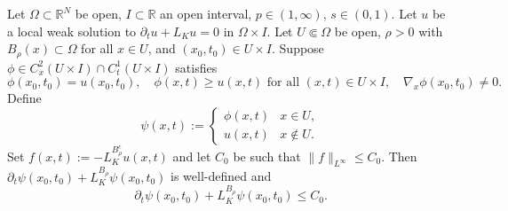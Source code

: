 \documentclass[11pt, a4paper, twoside]{article}
\theoremstyle{definition}
\theoremstyle{remark}
\newcommand{\R}{\mathbb{R}}
\begin{document}
\begin{proposition}
\label{prop:weak-to-visc-parabolic-noncritical}
Let $\Omega \subset \R^N$ be open, $I \subset \R$ an open interval, $p \in (1,\infty)$, $s \in (0,1)$. Let $u$ be a local weak solution to
$\partial_t u + L_K u = 0$ in $\Omega \times I$. 
Let $U \Subset \Omega$ be open, $\rho > 0$ with
$B_\rho(x) \subset \Omega$ for all $x \in U$, and
$(x_0,t_0) \in U \times I$. Suppose
$\phi \in C^2_x(U \times I) \cap C^1_t(U \times I)$
satisfies
\[
  \phi(x_0,t_0) = u(x_0,t_0), \quad
  \phi(x,t) \ge u(x,t) \text{ for all }
  (x,t) \in U \times I, \quad
  \nabla_x\phi(x_0,t_0) \neq 0.
\]
Define
\[
  \psi(x,t) :=
  \begin{cases}
    \phi(x,t) & x \in U, \\
    u(x,t)   & x \notin U.
  \end{cases}
\]
Set $f(x,t) := - L_K^{B_\rho^c}u(x,t)$
and let $C_0$ be such that $\|f\|_{L^\infty} \le C_0$. Then
$\partial_t\psi(x_0,t_0) + L_K^{B_\rho}\psi(x_0,t_0)$
is well-defined and
\[
  \partial_t\psi(x_0,t_0)
  + L_K^{B_\rho}\psi(x_0,t_0) \le C_0.
\]
\end{proposition}
\end{document}
